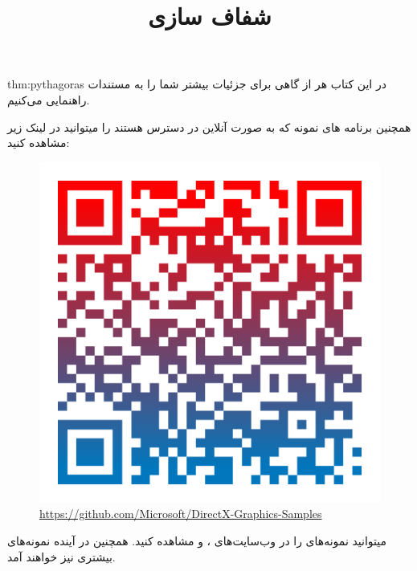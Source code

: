 {\begin{spacing}{1.5}
        \begin{point}{thm:pythagoras}
            در این کتاب هر از گاهی برای جزئیات بیشتر شما را به مستندات راهنمایی می‌کنیم.
        \end{point}
        همچنین برنامه های نمونه  که به صورت آنلاین در دسترس هستند را میتوانید در لینک زیر مشاهده کنید:

        \begin{figure}[H]
            \centering
            \setlength{\belowcaptionskip}{-10pt}
            \includegraphics[scale=0.15]{Images/3/3.Intro.1.3}
            \caption*{\Large \url{https://github.com/Microsoft/DirectX-Graphics-Samples}}
        \end{figure}

        میتوانید نمونه‌های  را در وب‌سایت‌های ،  و  مشاهده کنید. همچنین در آینده نمونه‌های بیشتری نیز خواهند آمد.
    \end{spacing}
}
\textbf{\vspace{10pt}}

\title{
    \huge
    \hspace{-40pt}
    \textbf{شفاف سازی}
}  \rullFillWithLine[0.5em]{1pt}
\textbf{\vspace{7pt}}

